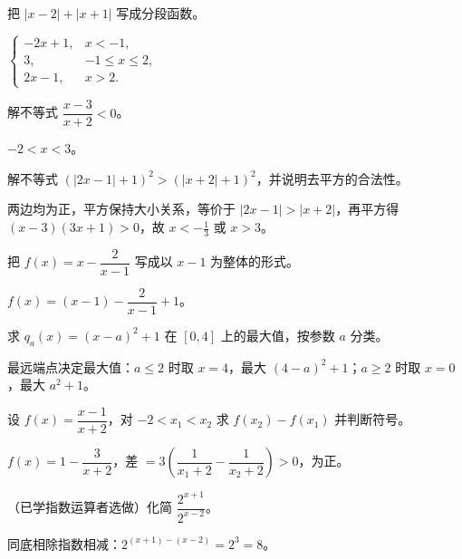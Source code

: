 \begin{problem}
把 $|x-2|+|x+1|$ 写成分段函数。
\end{problem}
\begin{solution}
$\begin{cases}-2x+1,&x<-1,\\ 3,&-1\le x\le2,\\ 2x-1,&x>2.\end{cases}$
\end{solution}

\begin{problem}
解不等式 $\dfrac{x-3}{x+2}<0$。
\end{problem}
\begin{solution}
$-2<x<3$。
\end{solution}

\begin{problem}
解不等式 $(|2x-1|+1)^2>(|x+2|+1)^2$，并说明去平方的合法性。
\end{problem}
\begin{solution}
两边均为正，平方保持大小关系，等价于 $|2x-1|>|x+2|$，再平方得 $(x-3)(3x+1)>0$，故 $x<-\tfrac13$ 或 $x>3$。
\end{solution}

\begin{problem}
把 $f(x)=x-\dfrac{2}{x-1}$ 写成以 $x-1$ 为整体的形式。
\end{problem}
\begin{solution}
$f(x)=(x-1)-\dfrac{2}{x-1}+1$。
\end{solution}

\begin{problem}
求 $q_a(x)=(x-a)^2+1$ 在 $[0,4]$ 上的最大值，按参数 $a$ 分类。
\end{problem}
\begin{solution}
最远端点决定最大值：$a\le2$ 时取 $x=4$，最大 $(4-a)^2+1$；$a\ge2$ 时取 $x=0$，最大 $a^2+1$。
\end{solution}

\begin{problem}
设 $f(x)=\dfrac{x-1}{x+2}$，对 $-2<x_1<x_2$ 求 $f(x_2)-f(x_1)$ 并判断符号。
\end{problem}
\begin{solution}
$f(x)=1-\dfrac{3}{x+2}$，差 $=3\left(\dfrac{1}{x_1+2}-\dfrac{1}{x_2+2}\right)>0$，为正。
\end{solution}

\begin{problem}
（已学指数运算者选做）化简 $\dfrac{2^{x+1}}{2^{x-2}}$。
\end{problem}
\begin{solution}
同底相除指数相减：$2^{(x+1)-(x-2)}=2^3=8$。
\end{solution}

